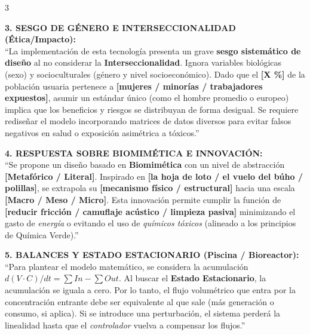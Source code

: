 \documentclass[11pt,landscape,letterpaper]{extarticle}
\begin{document}
\begin{multicols*}{3}
	\begin{tcolorbox}[colback=tipsbg,colframe=myred,boxrule=1.2pt,arc=3pt,left=3pt,right=3pt,top=2pt,bottom=2pt]
		\textbf{3. SESGO DE GÉNERO E INTERSECCIONALIDAD (Ética/Impacto):} \\
		``La implementación de esta tecnología presenta un grave \textbf{sesgo sistemático de diseño} al no considerar la \textbf{Interseccionalidad}. Ignora variables biológicas (sexo) y socioculturales (género y nivel socioeconómico). Dado que el \textbf{[X \%]} de la población usuaria pertenece a \textbf{[mujeres / minorías / trabajadores expuestos]}, asumir un estándar único (como el hombre promedio o europeo) implica que los beneficios y riesgos se distribuyan de forma desigual. Se requiere rediseñar el modelo incorporando matrices de datos diversos para evitar falsos negativos en salud o exposición asimétrica a tóxicos.''
	\end{tcolorbox}

	\begin{tcolorbox}[colback=tipsbg,colframe=myred,boxrule=1.2pt,arc=3pt,left=3pt,right=3pt,top=2pt,bottom=2pt]
		\textbf{4. RESPUESTA SOBRE BIOMIMÉTICA E INNOVACIÓN:} \\
		``Se propone un diseño basado en \textbf{Biomimética} con un nivel de abstracción \textbf{[Metafórico / Literal]}. Inspirado en \textbf{[la hoja de loto / el vuelo del búho / polillas]}, se extrapola su \textbf{[mecanismo físico / estructural]} hacia una escala \textbf{[Macro / Meso / Micro]}. Esta innovación permite cumplir la función de \textbf{[reducir fricción / camuflaje acústico / limpieza pasiva]} minimizando el gasto de \textit{energía} o evitando el uso de \textit{químicos tóxicos} (alineado a los principios de Química Verde).''
	\end{tcolorbox}

	\begin{tcolorbox}[colback=tipsbg,colframe=myred,boxrule=1.2pt,arc=3pt,left=3pt,right=3pt,top=2pt,bottom=2pt]
		\textbf{5. BALANCES Y ESTADO ESTACIONARIO (Piscina / Bioreactor):} \\
		``Para plantear el modelo matemático, se considera la acumulación $d(V \cdot C)/dt = \sum In - \sum Out$. Al buscar el \textbf{Estado Estacionario}, la acumulación se iguala a cero. Por lo tanto, el flujo volumétrico que entra por la concentración entrante debe ser equivalente al que sale (más generación o consumo, si aplica). Si se introduce una perturbación, el sistema perderá la linealidad hasta que el \textit{controlador} vuelva a compensar los flujos.''
	\end{tcolorbox}


\end{multicols*}
\end{document}
